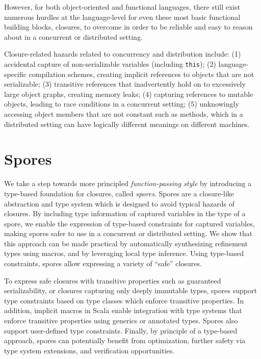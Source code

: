\documentclass[english]{lni}
\begin{document}
However, for both object-oriented and functional languages, there still exist
numerous hurdles at the language-level for even these most basic functional
building blocks, closures, to overcome in order to be reliable and easy to
reason about in a concurrent or distributed setting.

Closure-related hazards related to concurrency and distribution include: (1)
accidental capture of non-serializable variables (including \verb|this|); (2)
language-specific compilation schemes, creating implicit references to objects
that are not serializable; (3) transitive references that inadvertently hold
on to excessively large object graphs, creating memory leaks; (4) capturing
references to mutable objects, leading to race conditions in a concurrent
setting; (5) unknowingly accessing object members that are not constant such
as methods, which in a distributed setting can have logically different
meanings on different machines.

\vspace{-7mm}
\section{Spores}
\vspace{-5mm}
We take a step towards more principled {\em function-passing style}
by introducing a type-based foundation for closures, called {\em spores}.
Spores are a closure-like abstraction and type system which is designed to
avoid typical hazards of closures. By including type information of captured
variables in the type of a spore, we enable the expression of type-based
constraints for captured variables, making spores safer to use in a concurrent
or distributed setting. We show that this approach can be made practical by
automatically synthesizing refinement types using macros, and by leveraging
local type inference. Using type-based constraints, spores allow expressing a
variety of ``safe'' closures.

To express safe closures with transitive properties such as guaranteed
serializability, or closures capturing only deeply immutable types, spores
support type constraints based on type classes which enforce transitive
properties. In addition, implicit macros in Scala enable integration with type
systems that enforce transitive properties using generics or annotated types.
Spores also support user-defined type constraints. Finally, by principle of a
type-based approach, spores can potentially benefit from optimization, further
safety via type system extensions, and verification opportunities.
\end{document}
